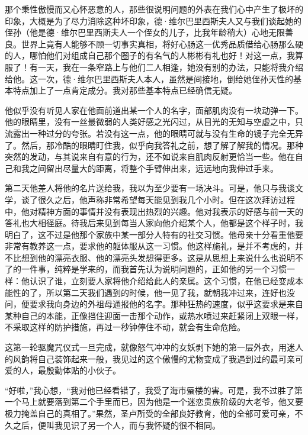 \par 那个秉性傲慢而又心怀恶意的人，那些很说明问题的外表在我们心中产生了极坏的印象，大概是为了尽力消除这种坏印象，德·维尔巴里西斯夫人又与我们谈起她的侄孙（他是德·维尔巴里西斯夫人一个侄女的儿子，比我年龄稍大）心地无限善良。世界上竟有人能够不顾一切事实真相，将好心肠这一优秀品质借给心肠那么硬的人，哪怕他们对组成自己那个圈子的有名气的人彬彬有礼也好！对这一点，我算服了！有一天，我在一条窄路上与他们二人相逢，她没有别的办法，只能将我介绍给他。这一次，德·维尔巴里西斯夫人本人，虽然是间接地，倒给她侄孙天性的基本特点加上了一点肯定成分。我对那些基本特点已经确信无疑。
\par 他似乎没有听见人家在他面前道出某一个人的名字，面部肌肉没有一块动弹一下。他的眼睛里，没有一丝最微弱的人类好感之光闪过，从目光的无知与空虚之中，只流露出一种过分的夸张。若没有这一点，他的眼睛可就与没有生命的镜子完全无异了。然后，那冷酷的眼睛盯住我，似乎向我答礼之前，想了解了解我的情况。那种突然的发动，与其说来自有意的行为，还不如说来自肌肉反射更恰当一些。他在自己和我之间留出尽量大的距离，将整个手臂伸出来，远远地向我伸过手来。
\par 第二天他差人将他的名片送给我，我以为至少要有一场决斗。可是，他只与我谈文学，谈了很久之后，他声称非常希望每天能见到我几个小时。但在这次拜访过程中，他对精神方面的事情并没有表现出热烈的兴趣。他对我表示的好感与前一天的答礼也大相径庭。待我后来见到每当人家向他介绍某个人，他都是这个样子时，我明白了，这不过是他那个家族中某一部分人特有的社交习惯。他母亲十分看重他要非常有教养这一点，要求他的躯体服从这一习惯。他这样施礼，是并不考虑的，并不比想到他的漂亮衣服、他的漂亮头发想得更多。这是从思想上来说什么也说明不了的一件事，纯粹是学来的，而我首先认为说明问题的，正如他的另一个习惯一样：他认识了谁，立刻要人家将他介绍给此人的亲属。这个习惯，在他已经变成本能性的了，所以第二天我们遇到的时候，他一见了我，就朝我冲过来，连好也没问，便要求我向身边的外祖母通报他的名字。那种狂热的速度，似乎这要求是来自某种自己的本能，正像挡住迎面一击那个动作，或热水喷过来赶紧闭上双眼一样，不采取这样的防护措施，再过一秒钟停住不动，就会有生命危险。
\par 这第一轮驱魔咒仪式一旦完成，就像怒气冲冲的女妖剥下她的第一层外衣，用迷人的风韵将自己装饰起来一般，我见过的这个傲慢的尤物变成了我遇到过的最可亲可爱的人，最殷勤体贴的小伙子。
\par “好啦，”我心想，“我对他已经看错了，我受了海市蜃楼的害。可是，我不过胜了第一个马上就要落到第二个手里而已，因为他是一个迷恋贵族阶级的大老爷，他又要极力掩盖自己的真相了。”果然，圣卢所受的全部良好教育，他的全部可爱可亲，不久之后，便叫我见识了另一个人，而与我怀疑的很不相同。
